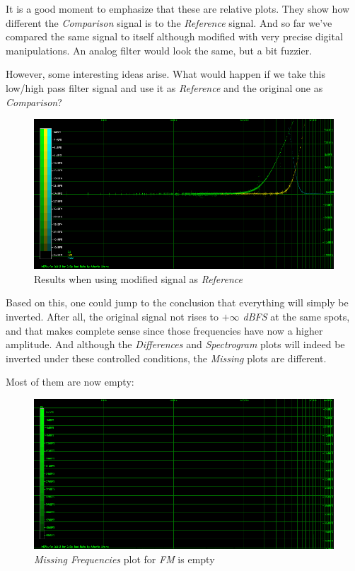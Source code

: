 \documentclass[10pt,a4paper]{report}
\begin{document}
It is a good moment to emphasize that these are relative plots. They show how different the \textit{Comparison} signal is to the \textit{Reference} signal. And so far we've compared the same signal to itself although modified with very precise digital manipulations. An analog filter would look the same, but a bit fuzzier. 

However, some interesting ideas arise. What would happen if we take this low/high pass filter signal and use it as \textit{Reference} and the original one as \textit{Comparison}?

\begin{figure}[H]
	\centering
	\includegraphics[width=1.0\linewidth]{plots/Plot4-7-Reversed}
	\caption[Reversed]{Results when using modified signal as \textit{Reference}}
	\label{fig:plot4-7-reversed}
\end{figure}

Based on this, one could jump to the conclusion that everything will simply be inverted. After all, the original signal not rises to \textit{$+\infty$ dBFS} at the same spots, and that makes complete sense since those frequencies have now a higher amplitude. And although the \textit{Differences} and \textit{Spectrogram} plots will indeed be inverted under these controlled conditions, the \textit{Missing} plots are different.

Most of them are now empty:

\begin{figure}[H]
	\centering
	\includegraphics[width=1.0\linewidth]{plots/Plot4-8-Missing-FM-Inverted}
	\caption[Reversed FM Missing]{\textit{Missing Frequencies} plot for \textit{FM} is empty}
	\label{fig:plot4-8-missing-fm-inverted}
\end{figure}
\end{document}

